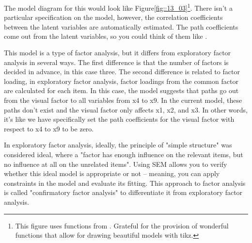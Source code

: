 \documentclass{ltjsbook}
\begin{document}
The model diagram for this would look like Figure\ref{fig::13_03}\footnote{This figure uses functions from \textcite{Onoshima2021}. Grateful for the provision of wonderful functions that allow for drawing beautiful models with tikz.}. There isn't a particular specification on the model, however, the correlation coefficients between the latent variables are automatically estimated. The path coefficients come out from the latent variables, so you could think of them like .


This model is a type of factor analysis, but it differs from exploratory factor analysis in several ways. The first difference is that the number of factors is decided in advance, in this case three. The second difference is related to factor loading, in exploratory factor analysis, factor loadings from the common factor are calculated for each item. In this case, the model suggests that paths go out from the visual factor to all variables from x4 to x9. In the current model, these paths don't exist and the visual factor only affects x1, x2, and x3. In other words, it's like we have specifically set the path coefficients for the visual factor with respect to x4 to x9 to be zero.

In exploratory factor analysis, ideally, the principle of "simple structure" was considered ideal, where a "factor has enough influence on the relevant items, but no influence at all on the unrelated items". Using SEM allows you to verify whether this ideal model is appropriate or not – meaning, you can apply constraints in the model and evaluate its fitting. This approach to factor analysis is called "confirmatory factor analysis" to differentiate it from exploratory factor analysis.
\end{document}
